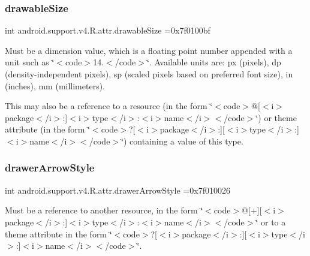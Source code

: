 \subsubsection{\texorpdfstring{drawable\+Size}{drawableSize}}
{\footnotesize\ttfamily int android.\+support.\+v4.\+R.\+attr.\+drawable\+Size =0x7f0100bf\hspace{0.3cm}{\ttfamily [static]}}

Must be a dimension value, which is a floating point number appended with a unit such as \char`\"{}$<$code$>$14.\+5sp$<$/code$>$\char`\"{}. Available units are\+: px (pixels), dp (density-\/independent pixels), sp (scaled pixels based on preferred font size), in (inches), mm (millimeters). 

This may also be a reference to a resource (in the form \char`\"{}$<$code$>$@\mbox{[}$<$i$>$package$<$/i$>$\+:\mbox{]}$<$i$>$type$<$/i$>$\+:$<$i$>$name$<$/i$>$$<$/code$>$\char`\"{}) or theme attribute (in the form \char`\"{}$<$code$>$?\mbox{[}$<$i$>$package$<$/i$>$\+:\mbox{]}\mbox{[}$<$i$>$type$<$/i$>$\+:\mbox{]}$<$i$>$name$<$/i$>$$<$/code$>$\char`\"{}) containing a value of this type. \mbox{\label{classandroid_1_1support_1_1v4_1_1R_1_1attr_acc9a8baf55ed984cc577be9f5aed18dd}} 
\subsubsection{\texorpdfstring{drawer\+Arrow\+Style}{drawerArrowStyle}}
{\footnotesize\ttfamily int android.\+support.\+v4.\+R.\+attr.\+drawer\+Arrow\+Style =0x7f010026\hspace{0.3cm}{\ttfamily [static]}}

Must be a reference to another resource, in the form \char`\"{}$<$code$>$@\mbox{[}+\mbox{]}\mbox{[}$<$i$>$package$<$/i$>$\+:\mbox{]}$<$i$>$type$<$/i$>$\+:$<$i$>$name$<$/i$>$$<$/code$>$\char`\"{} or to a theme attribute in the form \char`\"{}$<$code$>$?\mbox{[}$<$i$>$package$<$/i$>$\+:\mbox{]}\mbox{[}$<$i$>$type$<$/i$>$\+:\mbox{]}$<$i$>$name$<$/i$>$$<$/code$>$\char`\"{}. \mbox{\label{classandroid_1_1support_1_1v4_1_1R_1_1attr_af2e9cb4e052fc2c281ed319a8757c615}} 
